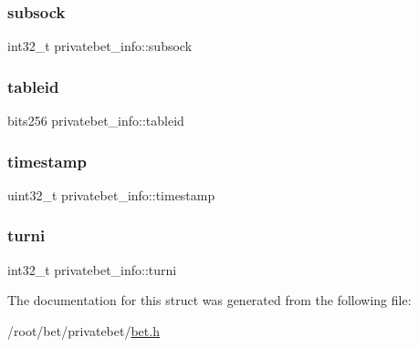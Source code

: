 \subsubsection{\texorpdfstring{subsock}{subsock}}
{\footnotesize\ttfamily int32\+\_\+t privatebet\+\_\+info\+::subsock}

\mbox{\label{structprivatebet__info_a2092f6f498aad90aa677505b82e48c9e}} 
\subsubsection{\texorpdfstring{tableid}{tableid}}
{\footnotesize\ttfamily bits256 privatebet\+\_\+info\+::tableid}

\mbox{\label{structprivatebet__info_a41d485812c76258fe86aa2ebb0a43e3b}} 
\subsubsection{\texorpdfstring{timestamp}{timestamp}}
{\footnotesize\ttfamily uint32\+\_\+t privatebet\+\_\+info\+::timestamp}

\mbox{\label{structprivatebet__info_a4a3070b8d22e8ce276a72d45db56353e}} 
\subsubsection{\texorpdfstring{turni}{turni}}
{\footnotesize\ttfamily int32\+\_\+t privatebet\+\_\+info\+::turni}



The documentation for this struct was generated from the following file\+:\begin{DoxyCompactItemize}
\item 
/root/bet/privatebet/\hyperlink{bet_8h}{bet.\+h}\end{DoxyCompactItemize}
